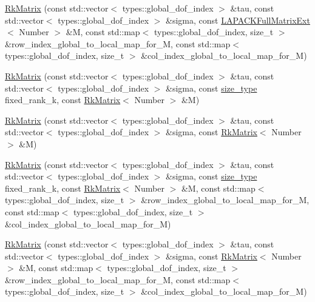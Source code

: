 \begin{DoxyCompactItemize}
\item 
\hyperlink{classRkMatrix_aee16f709a7a73d022add2f044cdcb26a}{Rk\+Matrix} (const std\+::vector$<$ types\+::global\+\_\+dof\+\_\+index $>$ \&tau, const std\+::vector$<$ types\+::global\+\_\+dof\+\_\+index $>$ \&sigma, const \hyperlink{classLAPACKFullMatrixExt}{L\+A\+P\+A\+C\+K\+Full\+Matrix\+Ext}$<$ Number $>$ \&M, const std\+::map$<$ types\+::global\+\_\+dof\+\_\+index, size\+\_\+t $>$ \&row\+\_\+index\+\_\+global\+\_\+to\+\_\+local\+\_\+map\+\_\+for\+\_\+M, const std\+::map$<$ types\+::global\+\_\+dof\+\_\+index, size\+\_\+t $>$ \&col\+\_\+index\+\_\+global\+\_\+to\+\_\+local\+\_\+map\+\_\+for\+\_\+M)
\item 
\hyperlink{classRkMatrix_aa5aff0d31115d7a67ef2f11db0b4ea24}{Rk\+Matrix} (const std\+::vector$<$ types\+::global\+\_\+dof\+\_\+index $>$ \&tau, const std\+::vector$<$ types\+::global\+\_\+dof\+\_\+index $>$ \&sigma, const \hyperlink{classRkMatrix_add060bfc3a4cc77f858c3d6dd58cadd5}{size\+\_\+type} fixed\+\_\+rank\+\_\+k, const \hyperlink{classRkMatrix}{Rk\+Matrix}$<$ Number $>$ \&M)
\item 
\hyperlink{classRkMatrix_a311b3ac28f647cb191eeb97a0b9d5815}{Rk\+Matrix} (const std\+::vector$<$ types\+::global\+\_\+dof\+\_\+index $>$ \&tau, const std\+::vector$<$ types\+::global\+\_\+dof\+\_\+index $>$ \&sigma, const \hyperlink{classRkMatrix}{Rk\+Matrix}$<$ Number $>$ \&M)
\item 
\hyperlink{classRkMatrix_a5a2841fc6a697007fafcab2619fc5390}{Rk\+Matrix} (const std\+::vector$<$ types\+::global\+\_\+dof\+\_\+index $>$ \&tau, const std\+::vector$<$ types\+::global\+\_\+dof\+\_\+index $>$ \&sigma, const \hyperlink{classRkMatrix_add060bfc3a4cc77f858c3d6dd58cadd5}{size\+\_\+type} fixed\+\_\+rank\+\_\+k, const \hyperlink{classRkMatrix}{Rk\+Matrix}$<$ Number $>$ \&M, const std\+::map$<$ types\+::global\+\_\+dof\+\_\+index, size\+\_\+t $>$ \&row\+\_\+index\+\_\+global\+\_\+to\+\_\+local\+\_\+map\+\_\+for\+\_\+M, const std\+::map$<$ types\+::global\+\_\+dof\+\_\+index, size\+\_\+t $>$ \&col\+\_\+index\+\_\+global\+\_\+to\+\_\+local\+\_\+map\+\_\+for\+\_\+M)
\item 
\hyperlink{classRkMatrix_a89ad98e45e6ae6c23a6ffc478c7ebb9f}{Rk\+Matrix} (const std\+::vector$<$ types\+::global\+\_\+dof\+\_\+index $>$ \&tau, const std\+::vector$<$ types\+::global\+\_\+dof\+\_\+index $>$ \&sigma, const \hyperlink{classRkMatrix}{Rk\+Matrix}$<$ Number $>$ \&M, const std\+::map$<$ types\+::global\+\_\+dof\+\_\+index, size\+\_\+t $>$ \&row\+\_\+index\+\_\+global\+\_\+to\+\_\+local\+\_\+map\+\_\+for\+\_\+M, const std\+::map$<$ types\+::global\+\_\+dof\+\_\+index, size\+\_\+t $>$ \&col\+\_\+index\+\_\+global\+\_\+to\+\_\+local\+\_\+map\+\_\+for\+\_\+M)

\end{DoxyCompactItemize}
